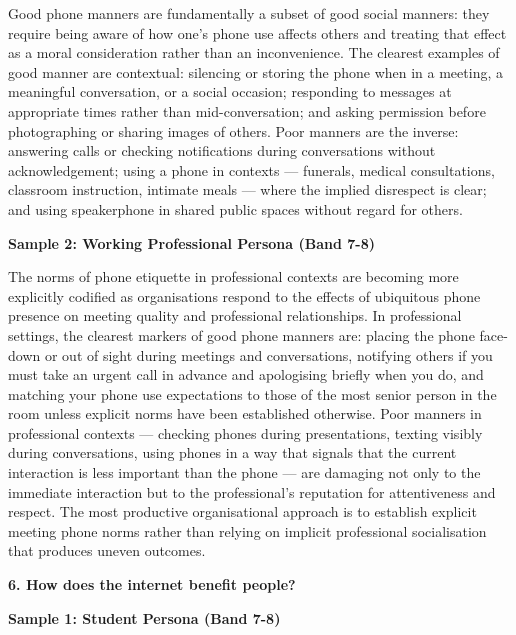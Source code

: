 Good phone manners are fundamentally a subset of good social manners: they require being aware of how one's phone use affects others and treating that effect as a moral consideration rather than an inconvenience. The clearest examples of good manner are contextual: silencing or storing the phone when in a meeting, a meaningful conversation, or a social occasion; responding to messages at appropriate times rather than mid-conversation; and asking permission before photographing or sharing images of others. Poor manners are the inverse: answering calls or checking notifications during conversations without acknowledgement; using a phone in contexts — funerals, medical consultations, classroom instruction, intimate meals — where the implied disrespect is clear; and using speakerphone in shared public spaces without regard for others.

\textbf{Sample 2: Working Professional Persona (Band 7-8)}

The norms of phone etiquette in professional contexts are becoming more explicitly codified as organisations respond to the effects of ubiquitous phone presence on meeting quality and professional relationships. In professional settings, the clearest markers of good phone manners are: placing the phone face-down or out of sight during meetings and conversations, notifying others if you must take an urgent call in advance and apologising briefly when you do, and matching your phone use expectations to those of the most senior person in the room unless explicit norms have been established otherwise. Poor manners in professional contexts — checking phones during presentations, texting visibly during conversations, using phones in a way that signals that the current interaction is less important than the phone — are damaging not only to the immediate interaction but to the professional's reputation for attentiveness and respect. The most productive organisational approach is to establish explicit meeting phone norms rather than relying on implicit professional socialisation that produces uneven outcomes.

\separator

\begin{ieltsquestion}
\textbf{6. How does the internet benefit people?}
\end{ieltsquestion}
\textbf{Sample 1: Student Persona (Band 7-8)}

